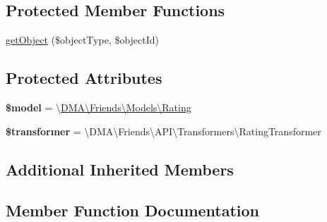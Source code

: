 \subsection*{Protected Member Functions}
\begin{DoxyCompactItemize}
\item 
\hyperlink{classDMA_1_1Friends_1_1API_1_1Resources_1_1RatingResource_af5e4c42c24fa134bf9de2dd6d0223e92}{get\+Object} (\$object\+Type, \$object\+Id)
\end{DoxyCompactItemize}
\subsection*{Protected Attributes}
\begin{DoxyCompactItemize}
\item 
\hypertarget{classDMA_1_1Friends_1_1API_1_1Resources_1_1RatingResource_a62f43e96144be5b5a6a7b423582cc9a1}{}{\bfseries \$model} = \textquotesingle{}\textbackslash{}\hyperlink{classDMA_1_1Friends_1_1Models_1_1Rating}{D\+M\+A\textbackslash{}\+Friends\textbackslash{}\+Models\textbackslash{}\+Rating}\textquotesingle{}\label{classDMA_1_1Friends_1_1API_1_1Resources_1_1RatingResource_a62f43e96144be5b5a6a7b423582cc9a1}

\item 
\hypertarget{classDMA_1_1Friends_1_1API_1_1Resources_1_1RatingResource_a905140d43f4bd0db5f7b2a1e3cd32256}{}{\bfseries \$transformer} = \textquotesingle{}\textbackslash{}D\+M\+A\textbackslash{}\+Friends\textbackslash{}\+A\+P\+I\textbackslash{}\+Transformers\textbackslash{}\+Rating\+Transformer\textquotesingle{}\label{classDMA_1_1Friends_1_1API_1_1Resources_1_1RatingResource_a905140d43f4bd0db5f7b2a1e3cd32256}

\end{DoxyCompactItemize}
\subsection*{Additional Inherited Members}


\subsection{Member Function Documentation}
\hypertarget{classDMA_1_1Friends_1_1API_1_1Resources_1_1RatingResource_a5f73df541d7ca7a1fa30b30278e38b67}{}
